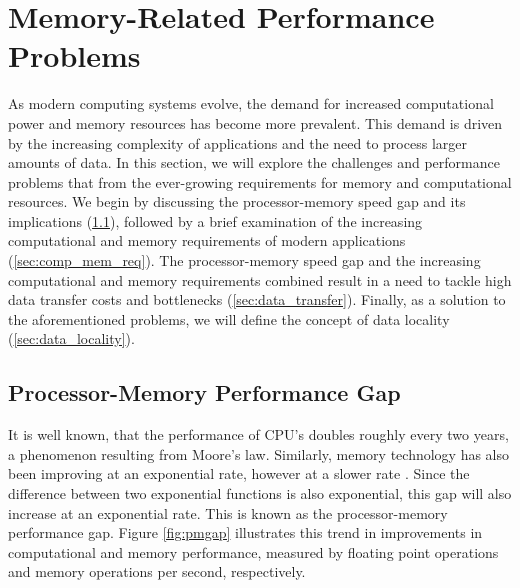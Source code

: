 \section{Memory-Related Performance Problems}\label{sec:background}
As modern computing systems evolve, the demand for increased computational power and memory resources has become more prevalent. This demand is driven by the increasing complexity of applications and the need to process larger amounts of data. In this section, we will explore the challenges and performance problems that from the ever-growing requirements for memory and computational resources. We begin by discussing the processor-memory speed gap and its implications (\ref{sec:pmgap}), followed by a brief examination of the increasing computational and memory requirements of modern applications (\ref{sec:comp_mem_req}). The processor-memory speed gap and the increasing computational and memory requirements combined result in a need to tackle high data transfer costs and bottlenecks (\ref{sec:data_transfer}). Finally, as a solution to the aforementioned problems, we will define the concept of data locality (\ref{sec:data_locality}).

\subsection{Processor-Memory Performance Gap}\label{sec:pmgap}
It is well known, that the performance of CPU's doubles roughly every two years, a phenomenon resulting from Moore's law. Similarly, memory technology has also been improving at an exponential rate, however at a slower rate \cite{efnusheva2017survey, machanick2002approaches, mckee2004reflections, mccalpin1997survey}. Since the difference between two exponential functions is also exponential, this gap will also increase at an exponential rate. This is known as the processor-memory performance gap. Figure \ref{fig:pmgap} illustrates this trend in improvements in computational and memory performance, measured by floating point operations and memory operations per second, respectively.


